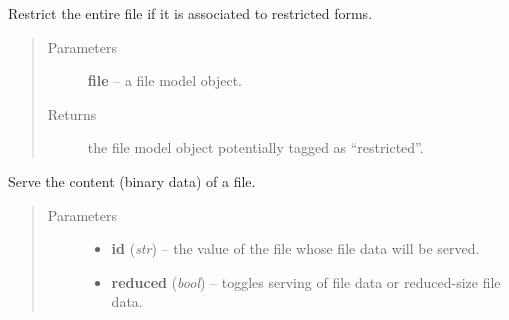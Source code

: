 \documentclass[letterpaper,10pt,english]{sphinxmanual}
\begin{document}

\begin{fulllineitems}
\label{api:onlinelinguisticdatabase.controllers.files.restrictFileByForms}
Restrict the entire file if it is associated to restricted forms.
\begin{quote}\begin{description}
\item[{Parameters}] \leavevmode
\textbf{file} -- a file model object.

\item[{Returns}] \leavevmode
the file model object potentially tagged as ``restricted''.

\end{description}\end{quote}

\end{fulllineitems}


\begin{fulllineitems}
\label{api:onlinelinguisticdatabase.controllers.files.serveFile}
Serve the content (binary data) of a file.
\begin{quote}\begin{description}
\item[{Parameters}] \leavevmode\begin{itemize}
\item {} 
\textbf{id} (\emph{str}) -- the  value of the file whose file data will be served.

\item {} 
\textbf{reduced} (\emph{bool}) -- toggles serving of file data or reduced-size file data.

\end{itemize}

\end{description}\end{quote}

\end{fulllineitems}

\end{document}
